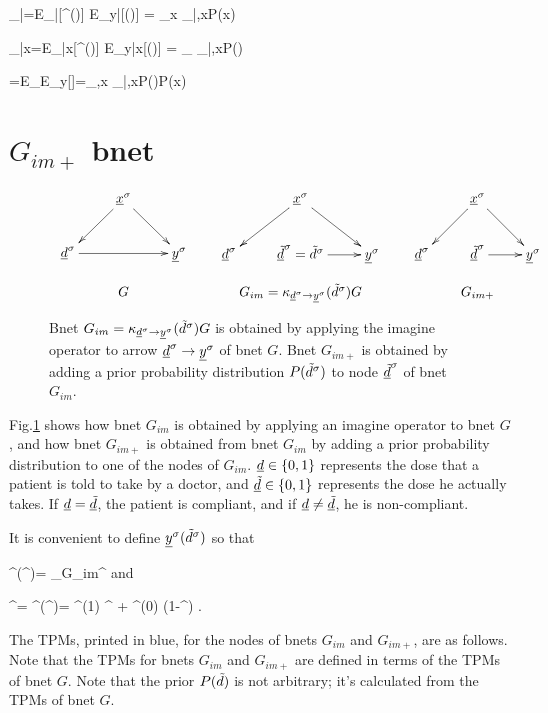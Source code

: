 \beq
\caly_{|\td}=E_{\s|\td}[\rvy^\s(\td)]
\rarrow E_{y|\td}[\rvy(\td)]
=
\sum_x \caly_{|\td,x}P(x)
\eeq

\beq
\caly_{|x}=E_{\s|x}[\rvy^\s(\td)]
\rarrow E_{y|x}[\rvy(\td)]
=
\sum_{\td} \caly_{|\td,x}P(\td)
\eeq


\beq
\caly=E_\s[\rvy^\s]
\rarrow E_y[\rvy]=\sum_{\td,x}
 \caly_{|\td,x}P(\td)P(x)
\eeq

\section{$G_{im+}$ bnet}


\begin{figure}[h!]
$$
\begin{array}{ccccc}
\xymatrix{
&\rvx^\s\ar[dl]\ar[dr]
\\
\rvd^\s\ar[rr]&&\rvy^\s
}
&&
\xymatrix{
&\rvx^\s\ar[dl]\ar[dr]
\\
\rvd^\s&\rvtd^\s=\td^\s\ar[r]&\rvy^\s
}
&&
\xymatrix{
&\rvx^\s\ar[dl]\ar[dr]
\\
\rvd^\s&\rvtd^\s\ar[r]&\rvy^\s
}
\\
\\
G&&G_{im}= \kappa_{\rvd^\s\rarrow\rvy^\s}
(\td^\s)G&&G_{im+}
\end{array}
$$
\caption{Bnet 
$G_{im}= \kappa_{{\underline{d}}^\sigma\rightarrow{\underline{y}}^\sigma}
({\tilde{d}}^\sigma)G$
is obtained by applying 
the imagine operator to arrow 
${\underline{d}}^\sigma\rightarrow{\underline{y}}^\sigma$
of bnet $G$. Bnet $ G_{im+}$
is obtained
by adding a prior
probability distribution $P({\tilde{d}}^\sigma)$
to node ${\underline{\tilde{d}}}^\sigma$ of
bnet $G_{im}$.
} 
\label{fig-po-G-im}
\end{figure}

Fig.\ref{fig-po-G-im}
shows how bnet $G_{im}$
is obtained by applying 
an imagine operator to bnet $G$,
and how bnet $G_{im+}$
is obtained from bnet 
$G_{im}$ by adding
a prior
probability distribution to
one of the nodes of $G_{im}$.
${\underline{d}}\in \{0,1\}$ represents the
dose that a patient 
is told to take by a doctor, and
${\underline{\tilde{d}}}\in \{0,1\}$ represents the 
dose he actually takes.
If ${\underline{d}}={\underline{\tilde{d}}}$, the
patient is compliant,
and if ${\underline{d}}\neq{\underline{\tilde{d}}}$, he is
non-compliant.


It is convenient to define
${\underline{y}}^\sigma({\tilde{d}}^\sigma)$ so that

\beq
\rvy^\s(\td^\s)=
\rvy_{G_{im}}^\s
\eeq
and

\beq
\rvy^\s=
\rvy^\s(\td^\s)=
\rvy^\s(1) \td^\s
+
\rvy^\s(0) (1-\td^\s)
\;.
\eeq 

The TPMs, printed in blue,
for the nodes of bnets $G_{im}$ and $G_{im+}$,
are as follows.
Note that the TPMs
for bnets  $G_{im}$ and $G_{im+}$
are defined in terms
of the TPMs of bnet $G$.
Note that
the prior
$P({\tilde{d}})$ is not arbitrary;
it's calculated from
the TPMs of bnet $G$.


